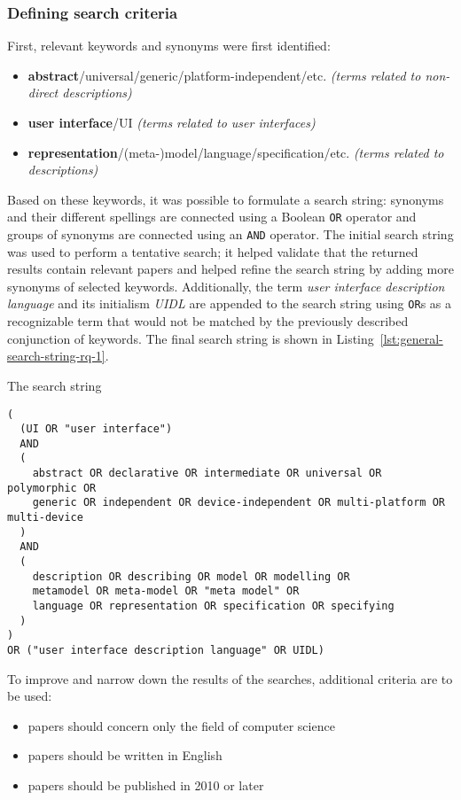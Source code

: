 \subsubsection{Defining search criteria}
First, relevant keywords and synonyms were first identified:
\begin{itemize}
    \item \textbf{abstract}/universal/generic/platform-independent/etc. \textit{(terms related to non-direct descriptions)}
    \item \textbf{user interface}/UI \textit{(terms related to user interfaces)}
    \item \textbf{representation}/(meta-)model/language/specification/etc. \textit{(terms related to descriptions)}
\end{itemize}
Based on these keywords, it was possible to formulate a search string: synonyms and their different spellings are connected using a Boolean \texttt{OR} operator and groups of synonyms are connected using an \texttt{AND} operator.
The initial search string was used to perform a tentative search;
it helped validate that the returned results contain relevant papers and helped refine the search string by adding more synonyms of selected keywords.
Additionally, the term \emph{user interface description language} and its initialism \emph{UIDL} are appended to the search string using \texttt{OR}s as a recognizable term that would not be matched by the previously described conjunction of keywords.
The final search string is shown in Listing~\ref{lst:general-search-string-rq-1}.
\begin{listing}
    \caption{The search string}
    \begin{verbatim}
(
  (UI OR "user interface")
  AND
  (
    abstract OR declarative OR intermediate OR universal OR polymorphic OR
    generic OR independent OR device-independent OR multi-platform OR multi-device
  )
  AND
  (
    description OR describing OR model OR modelling OR
    metamodel OR meta-model OR "meta model" OR
    language OR representation OR specification OR specifying
  )
)
OR ("user interface description language" OR UIDL)
    \end{verbatim}
    \label{lst:general-search-string-rq-1}
\end{listing}

To improve and narrow down the results of the searches, additional criteria are to be used:
\begin{samepage}
\begin{itemize}
    \item papers should concern only the field of computer science
    \item papers should be written in English
    \item papers should be published in 2010 or later
\end{itemize}
\end{samepage}

